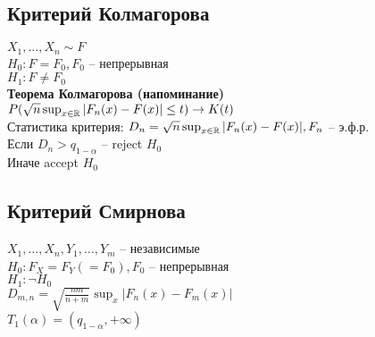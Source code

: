 \documentclass[12pt]{article}
\begin{document}
\subsection{Критерий Колмагорова}
$X_1, \ldots, X_n \sim F$\\
$H_0: F=F_0, F_0$ -- непрерывная\\
$H_1: F\neq F_0$\\
\textbf{Теорема Колмагорова (напоминание)}\\
$P(\sqrt{n} \sup_{x\in \mathbb{R}} |F_n(x) - F(x)| \leq t) \rightarrow K(t)$\\
Статистика критерия: $D_n = \sqrt{n}\sup_{x\in \mathbb{R}} |F_n(x) - F(x)|, F_n$ -- э.ф.р.\\
Если $D_n > q_{1-\alpha}$ -- reject $H_0$\\
Иначе accept $H_0$\\
\subsection{Критерий Смирнова}
$X_1, \dots, X_n, Y_1, \ldots, Y_m$ -- независимые\\
$H_0: F_X = F_Y (= F_0), F_0$ -- непрерывная\\
$H_1: \lnot H_0$\\
$D_{m,n} = \sqrt{\frac{nm}{n+m}} \sup_x |F_n(x) - F_m(x)|$\\
$T_1(\alpha) = (q_{1-\alpha}, +\infty)$\\
\end{document}

